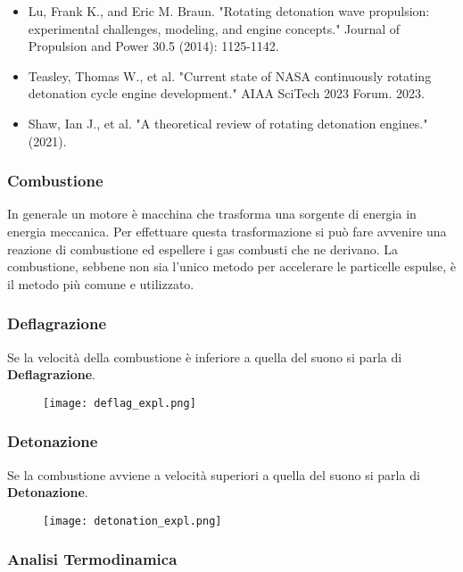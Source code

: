 \begin{frame}
    \maketitle
\end{frame}
\begin{frame}
  \begin{itemize}
    \item   Lu, Frank K., and Eric M. Braun. "Rotating detonation wave propulsion: experimental challenges, modeling, and engine concepts." Journal of Propulsion and Power 30.5 (2014): 1125-1142.
    \item Teasley, Thomas W., et al. "Current state of NASA continuously rotating detonation cycle engine development." AIAA SciTech 2023 Forum. 2023.
    \item Shaw, Ian J., et al. "A theoretical review of rotating detonation engines." (2021).

  \end{itemize}
\end{frame}
\begin{frame}
  \frametitle{Combustione}
  In generale un motore è macchina che trasforma una sorgente di energia in energia meccanica.
  Per effettuare questa trasformazione si può fare avvenire una reazione di combustione ed espellere i gas combusti che ne derivano.
  La combustione, sebbene non sia l'unico metodo per accelerare le particelle espulse, è il metodo più comune e utilizzato.
\end{frame}
\begin{frame}
  \frametitle{Deflagrazione}
  Se la velocità della combustione è inferiore a quella del suono si parla di \textbf{Deflagrazione}.
  \begin{figure}
    \texttt{[image: deflag\_expl.png]}
  \end{figure}
\end{frame}
\begin{frame}
  \frametitle{Detonazione}
Se la combustione avviene a velocità superiori a quella del suono si parla di \textbf{Detonazione}.
  \begin{figure}
    \texttt{[image: detonation\_expl.png]}
  \end{figure}
\end{frame}
\begin{frame}
  \frametitle{Analisi Termodinamica}
\end{frame}
